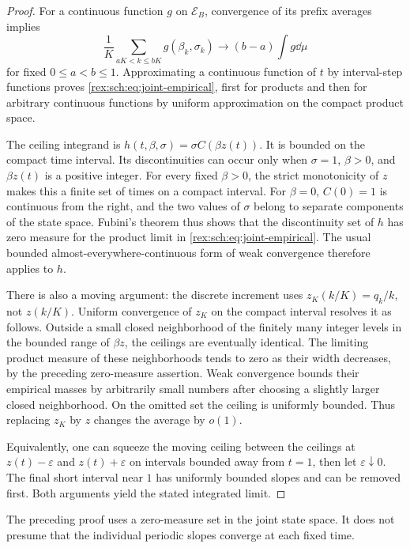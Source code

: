 \begin{proof}
For a continuous function $g$ on $\mathcal E_B$, convergence of its
prefix averages implies
\[
 \frac1K\sum_{aK<k\leq bK}g(\beta_k,\sigma_k)
 \longrightarrow(b-a)\int g\dd\mu
\]
for fixed $0\leq a<b\leq1$. Approximating a continuous function of
$t$ by interval-step functions proves \eqref{rex:sch:eq:joint-empirical},
first for products and then for arbitrary continuous functions by
uniform approximation on the compact product space.

The ceiling integrand is
$h(t,\beta,\sigma)=\sigma C(\beta z(t))$. It is bounded on the
compact time interval. Its discontinuities can occur only when
$\sigma=1$, $\beta>0$, and $\beta z(t)$ is a positive integer.
For every fixed $\beta>0$, the strict monotonicity of $z$ makes this
a finite set of times on a compact interval. For $\beta=0$, $C(0)=1$
is continuous from the right, and the two values of $\sigma$ belong
to separate components of the state space. Fubini's theorem thus
shows that the discontinuity set of $h$ has zero measure for the
product limit in \eqref{rex:sch:eq:joint-empirical}. The usual bounded
almost-everywhere-continuous form of weak convergence therefore
applies to $h$.

There is also a moving argument: the discrete increment uses
$z_K(k/K)=q_k/k$, not $z(k/K)$. Uniform convergence of $z_K$ on the
compact interval resolves it as follows. Outside a small closed
neighborhood of the finitely many integer levels in the bounded
range of $\beta z$, the ceilings are eventually identical. The
limiting product measure of these neighborhoods tends to zero as
their width decreases, by the preceding zero-measure assertion.
Weak convergence bounds their empirical masses by arbitrarily
small numbers after choosing a slightly larger closed neighborhood.
On the omitted set the ceiling is uniformly bounded. Thus replacing
$z_K$ by $z$ changes the average by $o(1)$.

Equivalently, one can squeeze the moving ceiling between the ceilings
at $z(t)-\varepsilon$ and $z(t)+\varepsilon$ on intervals bounded
away from $t=1$, then let $\varepsilon\downarrow0$. The final
short interval near $1$ has uniformly bounded slopes and can be
removed first. Both arguments yield the stated integrated limit.
\end{proof}

The preceding proof uses a zero-measure set in the joint state space.
It does not presume that the individual periodic slopes converge at
each fixed time.

